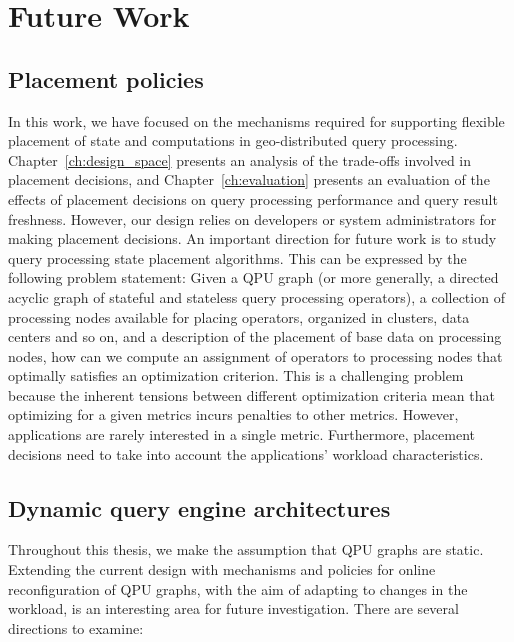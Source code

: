 \section{Future Work}

\subsection{Placement policies}

In this work, we have focused on the mechanisms required for supporting flexible placement of state
and computations in geo-distributed query processing.
Chapter~\ref{ch:design_space} presents an analysis of the trade-offs involved in placement decisions,
and Chapter~\ref{ch:evaluation} presents an evaluation of the effects of placement decisions on query processing performance
and query result freshness.
However, our design relies on developers or system administrators for making placement decisions.
An important direction for future work is to study query processing state placement algorithms.
This can be expressed by the following problem statement:
Given a QPU graph (or more generally, a directed acyclic graph of stateful and stateless query processing operators),
a collection of processing nodes available for placing operators, organized in clusters, data centers and so on,
and a description of the placement of base data on processing nodes,
how can we compute an assignment of operators to processing nodes that optimally satisfies an optimization criterion.
This is a challenging problem because the inherent tensions between different optimization criteria mean that
optimizing for a given metrics incurs penalties to other metrics.
However, applications are rarely interested in a single metric.
Furthermore, placement decisions need to take into account the applications' workload characteristics.

\subsection{Dynamic query engine architectures}

Throughout this thesis, we make the assumption that QPU graphs are static.
Extending the current design with mechanisms and policies for online reconfiguration of QPU graphs,
with the aim of adapting to changes in the workload, is an interesting area for future investigation.
There are several directions to examine:

